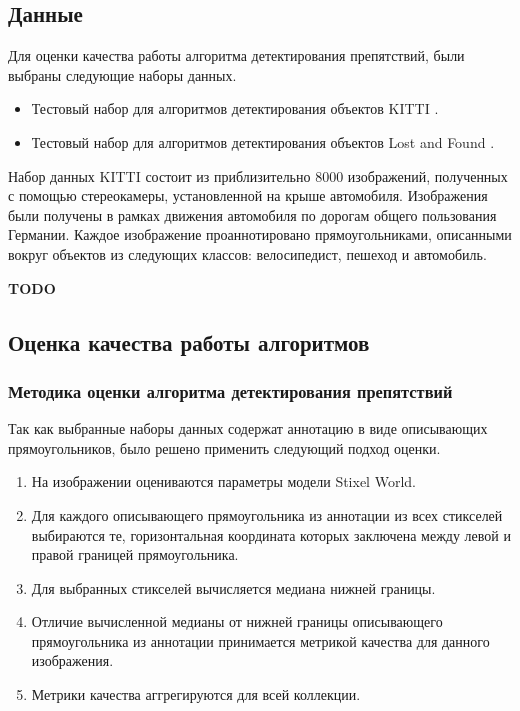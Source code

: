 \documentclass[aps,%
14pt,%
final,%
oneside,
onecolumn,%
musixtex, %
superscriptaddress,%
centertags]{extarticle} %
\begin{document}
\subsection{Данные}

Для оценки качества работы алгоритма детектирования препятствий, были выбраны следующие наборы данных.
\begin{itemize}
\item Тестовый набор для алгоритмов детектирования объектов KITTI \cite{Geiger2012CVPR}.
\item Тестовый набор для алгоритмов детектирования объектов Lost and Found \cite{pinggera2016lost}.
\end{itemize}

Набор данных KITTI состоит из приблизительно 8000 изображений, полученных с помощью стереокамеры, установленной на крыше автомобиля. Изображения были получены в рамках движения автомобиля по дорогам общего пользования Германии. Каждое изображение проаннотировано прямоугольниками, описанными вокруг объектов из следующих классов: велосипедист, пешеход и автомобиль.

\textbf{\Large \color{Red} TODO}

\subsection{Оценка качества работы алгоритмов}

\subsubsection{Методика оценки алгоритма детектирования препятствий}

Так как выбранные наборы данных содержат аннотацию в виде описывающих прямоугольников, было решено применить следующий подход оценки. 
\begin{enumerate}
\item На изображении оцениваются параметры модели Stixel World.
\item Для каждого описывающего прямоугольника из аннотации из всех стикселей выбираются те, горизонтальная координата которых заключена между левой и правой границей прямоугольника.
\item Для выбранных стикселей вычисляется медиана нижней границы.
\item Отличие вычисленной медианы от нижней границы описывающего прямоугольника из аннотации принимается метрикой качества для данного изображения.
\item Метрики качества аггрегируются для всей коллекции.
\end{enumerate}
\end{document}
